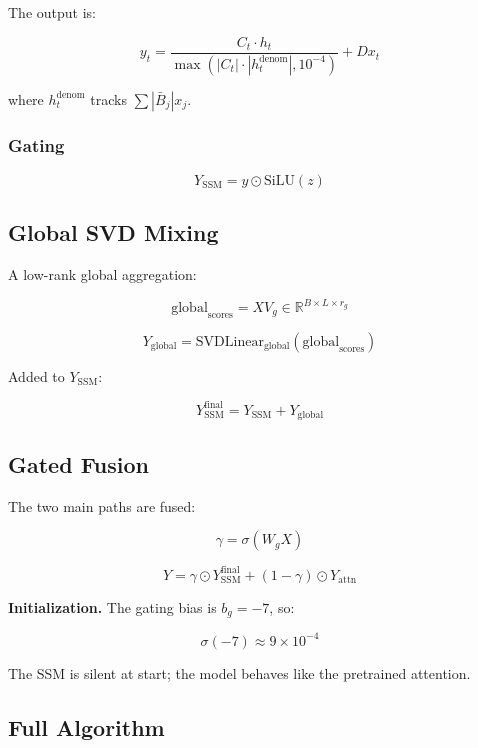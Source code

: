 The output is:

\[
y_t = \frac{C_t \cdot h_t}{\max(|C_t| \cdot |h_t^\text{denom}|, 10^{-4})} + D x_t
\tag{4.15}
\]

where $h_t^\text{denom}$ tracks $\sum |\bar{B}_j| x_j$.

\subsubsection{Gating}

\[
Y_\text{SSM} = y \odot \text{SiLU}(z)
\tag{4.16}
\]

\subsection{Global SVD Mixing}

A low-rank global aggregation:

\[
\text{global}_\text{scores} = X V_g \in \mathbb{R}^{B \times L \times r_g}
\tag{4.17}
\]

\[
Y_\text{global} = \text{SVDLinear}_\text{global}(\text{global}_\text{scores})
\tag{4.18}
\]

Added to $Y_\text{SSM}$:

\[
Y_\text{SSM}^\text{final} = Y_\text{SSM} + Y_\text{global}
\tag{4.19}
\]

\subsection{Gated Fusion}

The two main paths are fused:

\[
\gamma = \sigma(W_g X)
\tag{4.20}
\]

\[
Y = \gamma \odot Y_\text{SSM}^\text{final} + (1 - \gamma) \odot Y_\text{attn}
\tag{4.21}
\]

\textbf{Initialization.} The gating bias is $b_g = -7$, so:

\[
\sigma(-7) \approx 9 \times 10^{-4}
\tag{4.22}
\]

The SSM is silent at start; the model behaves like the pretrained attention.

\subsection{Full Algorithm}

